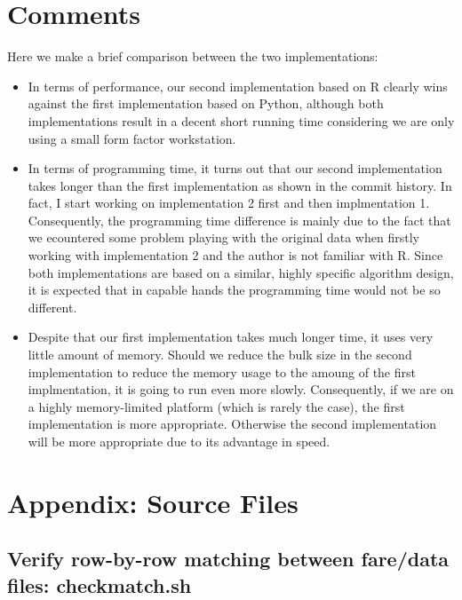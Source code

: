 \documentclass{article}
\begin{document}
\section{Comments}
Here we make a brief comparison between the two implementations:
\begin{itemize}
    \item In terms of performance, our second implementation based on R clearly
    wins against the first implementation based on Python, although both
    implementations result in a decent short running time considering we are
    only using a small form factor workstation.
    \item In terms of programming time, it turns out that our second
    implementation takes longer than the first implementation as shown in the
    commit history. In fact, I start working on implementation 2 first and then
    implmentation 1. Consequently, the programming time difference is mainly due
    to the fact that we ecountered some problem playing with the original data
    when firstly working with implementation 2 and the author is not familiar
    with R. Since both implementations are based on a similar, highly specific
    algorithm design, it is expected that in capable hands the programming time
    would not be so different.
    \item Despite that our first implementation takes much longer time, it uses
    very little amount of memory. Should we reduce the bulk size in the second
    implementation to reduce the memory usage to the amoung of the first
    implmentation, it is going to run even more slowly. Consequently, if we are
    on a highly memory-limited platform (which is rarely the case), the first
    implementation is more appropriate. Otherwise the second implementation will
    be more appropriate due to its advantage in speed.
\end{itemize}








\pagebreak
\section*{Appendix: Source Files}
\subsection*{Verify row-by-row matching between
fare/data files: \textbf{checkmatch.sh}}

\end{document}
